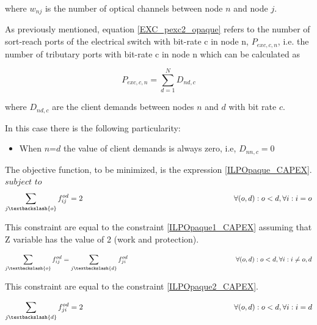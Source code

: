 \vspace{11pt}
where $w_{nj}$ is the number of optical channels between node $n$ and node $j$.

\vspace{11pt}
As previously mentioned, equation \ref{EXC_pexc2_opaque} refers to the number of sort-reach ports of the electrical switch with bit-rate c in node n, $P_{exc,c,n}$, i.e. the number of tributary ports with bit-rate c in node n which can be calculated as

\begin{equation}
P_{exc,c,n} = \sum_{d=1}^{N} D_{nd,c}
\label{EXC_pexc2_opaquep}
\end{equation}

\vspace{11pt}
where $D_{nd,c}$ are the client demands between nodes $n$ and $d$ with bit rate $c$.

\vspace{11pt}
In this case there is the following particularity:

\begin{itemize}
  \item When $n$=$d$ the value of client demands is always zero, i.e, $D_{nn,c}=0$
\end{itemize}


\vspace{17pt}
The objective function, to be minimized, is the expression \ref{ILPOpaque_CAPEX}.\\

$subject$ $to$
\begin{equation}
\sum_{j\textbackslash \{o\}} f_{ij}^{od} = 2  \qquad \qquad \qquad \qquad \qquad \qquad \qquad \qquad \qquad \qquad
\forall(o,d) : o < d, \forall i: i = o
\label{ILPOpaque1}
\end{equation}

This constraint are equal to the constraint \ref{ILPOpaque1_CAPEX} assuming that Z variable has the value of 2 (work and protection).

\begin{equation}
\sum_{j\textbackslash \{o\}} f_{ij}^{od} = \sum_{j\textbackslash \{d\}} f_{ji}^{od}   \qquad \qquad \qquad \qquad \qquad \qquad \qquad \qquad
\forall(o,d) : o < d, \forall i: i \neq o,d
\label{ILPOpaque2}
\end{equation}

This constraint are equal to the constraint \ref{ILPOpaque2_CAPEX}.

\begin{equation}
\sum_{j\textbackslash \{d\}} f_{ji}^{od} = 2  \qquad \qquad \qquad \qquad \qquad \qquad \qquad \qquad \qquad \qquad
\forall(o,d) : o < d, \forall i: i = d
\label{ILPOpaque3}
\end{equation}

